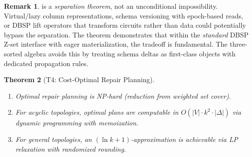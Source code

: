 \documentclass[11pt,a4paper]{article}
\newtheorem{theorem}{Theorem}[section]
\theoremstyle{definition}
\newtheorem{remark}[theorem]{Remark}
\begin{document}
\begin{remark}\label{rem:dbsp-limitation}
 is a \emph{separation theorem}, not an unconditional
impossibility.  Virtual/lazy column representations, schema versioning with
epoch-based reads, or DBSP lift operators that transform circuits rather than
data could potentially bypass the separation.  The theorem demonstrates that
within the \emph{standard} DBSP Z-set interface with eager materialization,
the tradeoff is fundamental.  The three-sorted algebra avoids this by treating
schema deltas as first-class objects with dedicated propagation rules.
\end{remark}

\begin{theorem}[T4: Cost-Optimal Repair Planning]\label{thm:repair-planning}
\begin{enumerate}[label=(\alph*)]
  \item Optimal repair planning is NP-hard (reduction from weighted set cover).
  \item For acyclic topologies, optimal plans are computable in
    $O(|V| \cdot k^2 \cdot |\Delta|)$ via dynamic programming with
    memoization.
  \item For general topologies, an $(\ln k + 1)$-approximation is
    achievable via LP relaxation with randomized rounding.
\end{enumerate}
\end{theorem}
\end{document}
